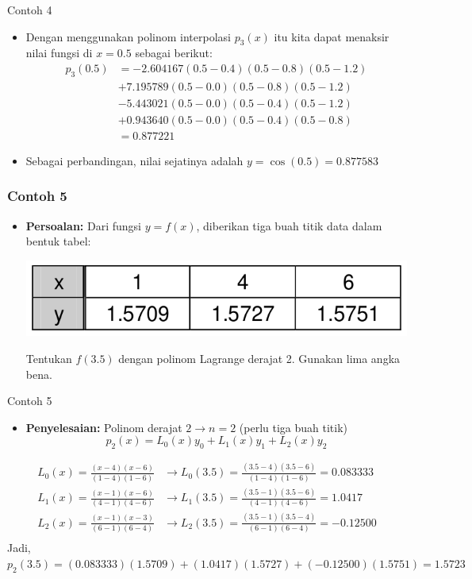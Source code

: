 \documentclass[pdflatex,compress,mathserif]{beamer}
\begin{document}
\begin{frame}{Contoh 4}
	\begin{itemize}
		\item Dengan menggunakan polinom interpolasi $ p_3 (x) $ itu kita dapat menaksir nilai fungsi di $ x = 0.5 $ sebagai berikut:
		\begin{align*}
			p_3(0.5) &= -2.604167(0.5 - 0.4)(0.5 - 0.8)(0.5 - 1.2) \\
			&+ 7.195789(0.5 - 0.0)(0.5 - 0.8)(0.5 - 1.2) \\
			&-5.443021(0.5 - 0.0)(0.5 - 0.4)(0.5 - 1.2) \\
			&+ 0.943640(0.5 - 0.0)(0.5 - 0.4)(0.5 - 0.8) \\
			&= 0.877221
		\end{align*}
		\item Sebagai perbandingan, nilai sejatinya adalah
		$ y = \cos(0.5) = 0.877583 $
	\end{itemize}
\end{frame}

\begin{frame}
	\frametitle{Contoh 5}
	\begin{itemize}
		\item \textbf{Persoalan:} Dari fungsi $ y = f(x) $, diberikan tiga buah titik data dalam bentuk tabel:
		\begin{center}
			\includegraphics[width=0.7\linewidth]{img/img10}
		\end{center}
		Tentukan $ f(3.5) $ dengan polinom Lagrange derajat 2. Gunakan lima angka bena.
	\end{itemize}
\end{frame}

\begin{frame}{Contoh 5}
	\begin{itemize}
		\item \textbf{Penyelesaian:} Polinom derajat $ 2 \rightarrow n = 2 $ (perlu tiga buah titik)
		\[ p_2 (x) = L_0 (x) y_0 + L_1 (x) y_1 + L_2 (x) y_2 \]
	\end{itemize}
	\begin{align*}
		L_0(x) = \frac{( x - 4 )( x - 6 )}{( 1 - 4 )( 1 - 6 )} &\rightarrow L_0(3.5) = \frac{( 3 . 5 - 4 )( 3 . 5 - 6 )}{( 1 - 4 )( 1 - 6 )} = 0.083333 \\
		L_1(x) = \frac{( x - 1 )( x - 6 )}{( 4 - 1 )( 4 - 6 )} &\rightarrow L_1(3.5) = \frac{( 3 . 5 - 1 )( 3 . 5 - 6 )}{( 4 - 1 )( 4 - 6 )} = 1.0417 \\
		L_2(x) = \frac{( x - 1 )( x - 3 )}{( 6 - 1 )( 6 - 4 )} &\rightarrow L_2(3.5) = \frac{( 3 . 5 - 1 )( 3 . 5 - 4 )}{( 6 - 1 )( 6 - 4 )} = -0.12500 \\
	\end{align*}
		Jadi, $ p_2(3.5) = (0.083333)(1.5709) + (1.0417)(1.5727) + (-0.12500)(1.5751) = 1.5723 $
\end{frame}
\end{document}
